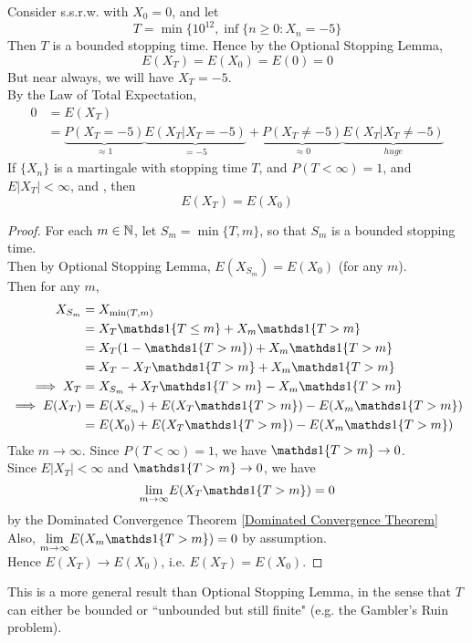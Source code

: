 \documentclass[11pt]{article}
\renewcommand{\limit}[1]{\underset{{#1} \rightarrow \infty}{\lim}}
\begin{document}
    
    \example
    Consider s.s.r.w. with $X_0 = 0$, and let
    $$T = \min\{ 10^{12}, \inf\{ n \geq 0: X_n = -5\}$$
    Then $T$ is a bounded stopping time. Hence by the Optional Stopping Lemma, 
    $$E(X_T) = E(X_0) = E(0) = 0$$
    But near always, we will have $X_T = -5$.\\
    By the Law of Total Expectation,
    \begin{align*}
    	0 &= E(X_T) \\
    	&= \underbrace{P(X_T = -5)}_{\approx 1}\underbrace{E(X_T|X_T = -5)}_{=-5} + \underbrace{P(X_T \neq -5)}_{\approx 0}\underbrace{E(X_T|X_T \neq -5)}_{huge}
    \end{align*}
     If $\{X_n\}$ is a martingale with stopping time $T$, and $P(T < \infty) = 1$, and $E|X_T| < \infty$, and \blue{$\limit{n} E(X_n \id{T > n}) = 0$}, then
    $$E(X_T) = E(X_0)$$
    \begin{proof}
    	For each $m \in \mathbb{N}$, let $S_m = \min\{T, m\}$, so that $S_m$ is a bounded stopping time. \\
    	Then by Optional Stopping Lemma, $E(X_{S_m}) = E(X_0)$ (for any $m$). \\
    	Then for any $m$,
    	\begin{align*}
    		X_{S_m} &= X_{\min(T,m)} \\
    		&= X_T\id{T\leq m} + X_m\id{T>m} \\
    		&= X_T(1 - \id{T>m}) + X_m\id{T>m} \\
    		&= X_T - X_T\id{T>m} + X_m\id{T>m} \\
    		\implies X_T &= X_{S_m} + X_T\id{T>m} - X_m\id{T>m} \\
    		\implies E(X_T) &= E(X_{S_m}) + E(X_T\id{T>m}) - E(X_m\id{T>m}) \\
    		&= E(X_0) + E(X_T\id{T>m}) - E(X_m\id{T>m})
    	\end{align*}
    	Take $m\rightarrow \infty$. Since $P(T<\infty) = 1$, we have $\id{T>m} \rightarrow 0$.\\
    	Since $E|X_T| < \infty$ and $\id{T>m} \rightarrow 0$, we have
    	$$\limit{m} E(X_T\id{T>m}) = 0$$
    	by the Dominated Convergence Theorem \ref{Dominated Convergence Theorem} \\
    	Also, $\limit{m}E(X_m\id{T>m}) = 0$ by assumption.\\ 
    	Hence $E(X_T) \rightarrow E(X_0)$, i.e. $E(X_T) = E(X_0)$.
    \end{proof}
    \remark
    This is a more general result than Optional Stopping Lemma, in the sense that $T$ can either be bounded or ``unbounded but still finite" (e.g. the Gambler's Ruin problem).
    
\end{document}
